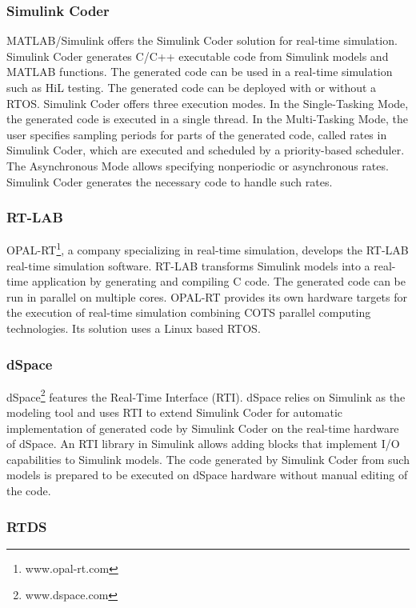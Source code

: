 \subsubsection{Simulink Coder}

MATLAB/Simulink offers the Simulink Coder solution for real-time simulation. Simulink Coder generates C/C++ executable code from Simulink models and MATLAB functions. The generated code can be used in a real-time simulation such as HiL testing. The generated code can be deployed with or without a RTOS. Simulink Coder offers three execution modes. In the Single-Tasking Mode, the generated code is executed in a single thread. In the Multi-Tasking Mode, the user specifies sampling periods for parts of the generated code, called rates in Simulink Coder, which are executed and scheduled by a priority-based scheduler. The Asynchronous Mode allows specifying nonperiodic or asynchronous rates. Simulink Coder generates the necessary code to handle such rates.

\subsubsection{RT-LAB}

OPAL-RT\footnote{www.opal-rt.com}, a company specializing in real-time simulation, develops the RT-LAB real-time simulation software. RT-LAB transforms Simulink models into a real-time application by generating and compiling C code. The generated code can be run in parallel on multiple cores. OPAL-RT provides its own hardware targets for the execution of real-time simulation combining COTS parallel computing technologies. Its solution uses a Linux based RTOS.

\subsubsection{dSpace}

dSpace\footnote{www.dspace.com} features the Real-Time Interface (RTI). dSpace relies on Simulink as the modeling tool and uses RTI to extend Simulink Coder for automatic implementation of generated code by Simulink Coder on the real-time hardware of dSpace. An RTI library in Simulink allows adding blocks that implement I/O capabilities to Simulink models. The code generated by Simulink Coder from such models is prepared to be executed on dSpace hardware without manual editing of the code.

\subsubsection{RTDS}

